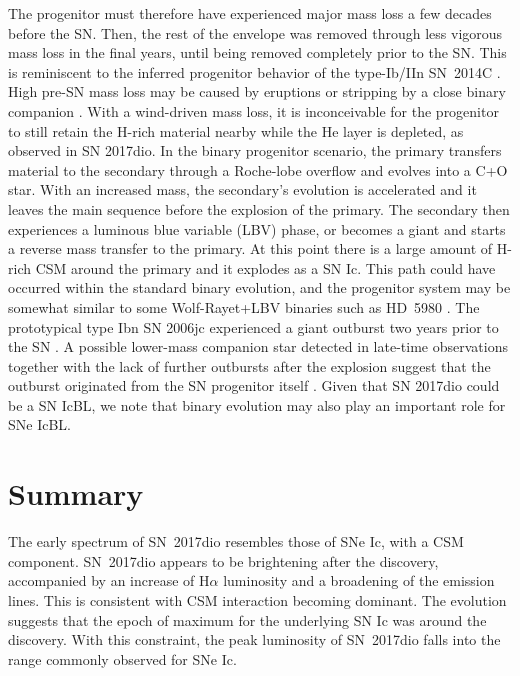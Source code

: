 \documentclass[twocolumn]{aastex61}
\begin{document}
The progenitor must {therefore} have experienced major mass loss a few decades before the SN. {Then,} the rest of the envelope was removed through less vigorous mass loss in the final years, until being removed completely prior to the SN. This is reminiscent to the inferred progenitor behavior of the type-Ib/IIn SN~2014C \citep{milisav15}.
High pre-SN mass loss may be caused by eruptions \citep[e.g.][]{smith14} or stripping by a close binary companion \citep[e.g.][]{yoon17}.
With a wind-driven mass loss, it is inconceivable for the progenitor to still retain the H-rich material nearby while the He layer is depleted, as observed in SN 2017dio.
In the binary progenitor scenario, the primary transfers material to the secondary through a Roche-lobe overflow and evolves into a C+O star. With an increased mass, the secondary's evolution is accelerated and it leaves the main sequence before the explosion of the primary. The secondary then experiences a luminous blue variable (LBV) phase, or becomes a giant and starts a reverse mass transfer to the primary. At this point there is a large amount of H-rich CSM around the primary and it explodes as a SN Ic. 
This path could have occurred within the standard binary evolution, and the progenitor system may be somewhat similar to some Wolf-Rayet+LBV binaries such as HD~5980 \citep{koenig14}.
{The prototypical type Ibn SN 2006jc experienced a giant outburst two years prior to the SN \citep{pastorello07}. A possible lower-mass companion star detected in late-time observations together with the lack of further outbursts after the explosion suggest that the outburst originated from the SN progenitor itself \citep{maund16}.}
Given that SN 2017dio could be a SN IcBL, we note that binary evolution may also play an important role for SNe IcBL.


\section{Summary}

The early spectrum of SN~2017dio resembles those of SNe Ic, with a CSM component.
SN~2017dio appears to be brightening after {the} discovery, accompanied by an increase of H$\alpha$ luminosity and a broadening of the emission lines. This is consistent with CSM interaction becoming dominant.
The evolution suggests that the epoch of maximum for the underlying SN Ic was around {the} discovery. With this constraint, the peak luminosity of SN~2017dio falls into the range commonly observed for SNe Ic.
\end{document}
